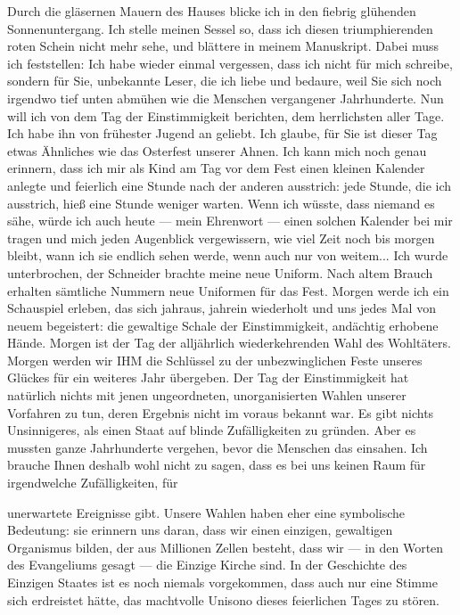 Durch die gläsernen Mauern des Hauses blicke ich in den fiebrig
glühenden Sonnenuntergang. Ich stelle meinen Sessel so, dass ich
diesen triumphierenden roten Schein nicht mehr sehe, und blättere
in meinem Manuskript. Dabei muss ich feststellen: Ich habe wieder
einmal vergessen, dass ich nicht für mich schreibe, sondern für
Sie, unbekannte Leser, die ich liebe und bedaure, weil Sie sich
noch irgendwo tief unten abmühen wie die Menschen vergangener
Jahrhunderte. Nun will ich von dem Tag der Einstimmigkeit
berichten, dem herrlichsten aller Tage. Ich habe ihn von frühester
Jugend an geliebt. Ich glaube, für Sie ist dieser Tag etwas
Ähnliches wie das Osterfest unserer Ahnen. Ich kann mich noch genau
erinnern, dass ich mir als Kind am Tag vor dem Fest einen kleinen
Kalender anlegte und feierlich eine Stunde nach der anderen
ausstrich: jede Stunde, die ich ausstrich, hieß eine Stunde weniger
warten. Wenn ich wüsste, dass niemand es sähe, würde ich auch heute
— mein Ehrenwort — einen solchen Kalender bei mir tragen und mich
jeden Augenblick vergewissern, wie viel Zeit noch bis morgen
bleibt, wann ich sie endlich sehen werde, wenn auch nur von
weitem... Ich wurde unterbrochen, der Schneider brachte meine neue
Uniform. Nach altem Brauch erhalten sämtliche Nummern neue
Uniformen für das Fest. Morgen werde ich ein Schauspiel erleben,
das sich jahraus, jahrein wiederholt und uns jedes Mal von neuem
begeistert: die gewaltige Schale der Einstimmigkeit, andächtig
erhobene Hände. Morgen ist der Tag der alljährlich wiederkehrenden
Wahl des Wohltäters. Morgen werden wir IHM die Schlüssel zu der
unbezwinglichen Feste unseres Glückes für ein weiteres Jahr
übergeben. Der Tag der Einstimmigkeit hat natürlich nichts mit
jenen ungeordneten, unorganisierten Wahlen unserer Vorfahren zu
tun, deren Ergebnis nicht im voraus bekannt war. Es gibt nichts
Unsinnigeres, als einen Staat auf blinde Zufälligkeiten zu gründen.
Aber es mussten ganze Jahrhunderte vergehen, bevor die Menschen das
einsahen. Ich brauche Ihnen deshalb wohl nicht zu sagen, dass es
bei uns keinen Raum für irgendwelche Zufälligkeiten, für

unerwartete Ereignisse gibt. Unsere Wahlen haben eher eine
symbolische Bedeutung: sie erinnern uns daran, dass wir einen
einzigen, gewaltigen Organismus bilden, der aus Millionen Zellen
besteht, dass wir — in den Worten des Evangeliums gesagt — die
Einzige Kirche sind. In der Geschichte des Einzigen Staates ist es
noch niemals vorgekommen, dass auch nur eine Stimme sich erdreistet
hätte, das machtvolle Unisono dieses feierlichen Tages zu stören.

